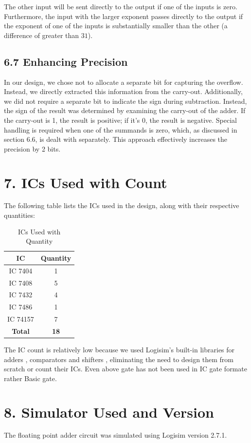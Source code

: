 \documentclass{article}
\begin{document}
The other input will be sent directly to the output if one of the inputs is zero. Furthermore, the input with the larger exponent passes directly to the output if the exponent of one of the inputs is substantially smaller than the other (a difference of greater than $31$).


\subsection*{6.7 Enhancing Precision}
In our design, we chose not to allocate a separate bit for capturing the overflow. Instead, we directly extracted this information from the carry-out. Additionally, we did not require a separate bit to indicate the sign during subtraction. Instead, the sign of the result was determined by examining the carry-out of the adder. If the carry-out is 1, the result is positive; if it's 0, the result is negative. Special handling is required when one of the summands is zero, which, as discussed in section 6.6, is dealt with separately. This approach effectively increases the precision by 2 bits.


\section*{7. ICs Used with Count}

The following table lists the ICs used in the design, along with their respective quantities:

\begin{table}[h!]
\centering
\begin{tabular}{|c|c|}
\hline
\textbf{IC} & \textbf{Quantity} \\ \hline
IC 7404 & 1 \\ \hline
IC 7408 & 5 \\ \hline
IC 7432 & 4 \\ \hline
IC 7486 & 1 \\ \hline
IC 74157 & 7 \\ \hline
\textbf{Total} & \textbf{18} \\ \hline
\end{tabular}
\caption{ICs Used with Quantity}
\end{table}

\noindent
The IC count is relatively low because we used Logisim's built-in libraries for adders , comparators and shifters , eliminating the need to design them from scratch or count their ICs.
Even above gate has not been used in IC gate formate rather Basic gate.
\section*{8. Simulator Used and Version}
The floating point adder circuit was simulated using Logisim version 2.7.1.
\end{document}
